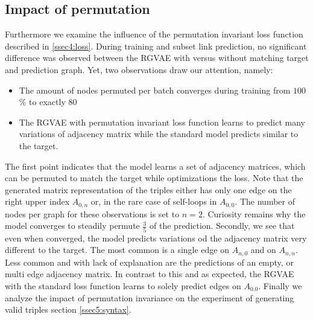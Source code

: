 \subsection{Impact of permutation}

Furthermore we examine the influence of the permutation invariant loss function described in \ref{ssec4:loss}. During training and subset link prediction, no significant difference was observed between the RGVAE with versus without matching target and prediction graph. Yet, two observations draw our attention, namely:

\begin{itemize}
  \item The amount of nodes permuted per batch converges during training from $100$\% to exactly $80$%
  \item The RGVAE with permutation invariant loss function learns to predict many variations of adjacency matrix while the standard model predicts similar to the target.
\end{itemize}

The first point indicates that the model learns a set of adjacency matrices, which can be permuted to match the target while optimizations the loss. Note that the generated matrix representation of the triples either has only one edge on the right upper index $A_{0,n}$ or, in the rare case of self-loops in $A_{0,0}$. The number of nodes per graph for these observations is set to $n=2$. Curiosity remains why the model converges to steadily permute $\frac{3}{5}$ of the prediction.
Secondly, we see that even when converged, the model predicts variations od the adjacency matrix very different to the target. The most common is a single edge on $A_{n,0}$ and on $A_{n,n}$. Less common and with lack of explanation are the predictions of an empty, or multi edge adjacency matrix. In contrast to this and as expected, the RGVAE with the standard loss function learns to solely predict edges on $A_{0.0}$. 
Finally we analyze the impact of permutation invariance on the experiment of generating valid triples section \ref{ssec5:syntax}.






